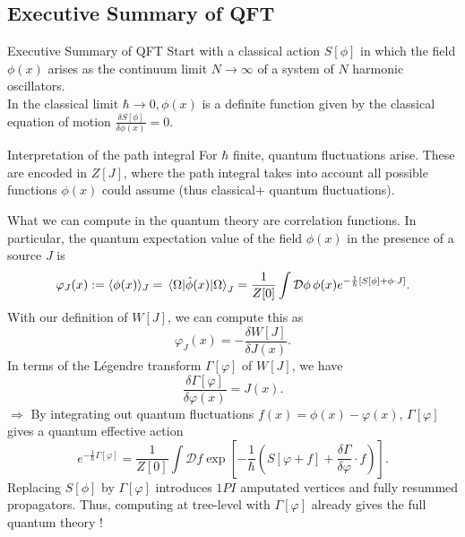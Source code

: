 \subsection{Executive Summary of QFT }
\begin{mybox}{Executive Summary of QFT}
Start with a classical action $S[\phi]$ in which the field $\phi(x)$ arises as the continuum limit $N\rightarrow \infty$ of a system of $N$ harmonic oscillators.\\
In the classical limit $\hbar \rightarrow 0, \phi(x)$ is a definite function given by the classical equation of motion $\frac{\delta S[\phi]}{\delta \phi(x)}=0$.
\begin{mybox}{Interpretation of the path integral}
	For $\hbar$ finite, quantum fluctuations arise. These are encoded in $Z[J]$, where the path integral takes into account all possible functions $\phi(x)$ could assume (thus classical+ quantum fluctuations).
\end{mybox}
What we can compute in the quantum theory are correlation functions. In particular, the quantum expectation value of the field $\phi(x)$ in the presence of a source $J$ is
\begin{equation}
	\varphi_J(x) := \langle \phi(x) \rangle_J = \expval{\hat{ \phi}(x) }{\Omega}_J = \frac{1}{Z[0]} \int \mathcal{D}\phi \, \phi(x) e^{- \frac{1}{\hbar} [S[\phi] + \phi \cdot J]}.
\end{equation}
With our definition of $W[J]$, we can compute this as 
\begin{equation}
	\varphi_J(x) = - \frac{\delta W[J]}{\delta J(x)}.
\end{equation}
In terms of the Légendre transform $\Gamma[\varphi]$ of $W[J]$, we have
\begin{equation}
	\frac{\delta \Gamma[\varphi]}{\delta \varphi(x)} = J(x).
\end{equation}
$\Rightarrow$ By integrating out quantum fluctuations $f(x)=\phi(x)-\varphi(x)$, $\Gamma[\varphi]$ gives a quantum effective action
\begin{equation}
	e^{- \frac{1}{\hbar} \Gamma[\varphi]} = \frac{1}{Z[0]} \int \mathcal{D}f \exp\left[-\frac{1}{\hbar} \left(S[\varphi+f] + \frac{\delta \Gamma}{\delta \varphi} \cdot f\right)\right].
\end{equation}
Replacing $S[\phi]$ by $\Gamma[\varphi]$ introduces $1PI$ amputated vertices and fully resummed propagators. Thus, computing at tree-level with $\Gamma[\varphi]$ already gives the full quantum theory !
\end{mybox}


